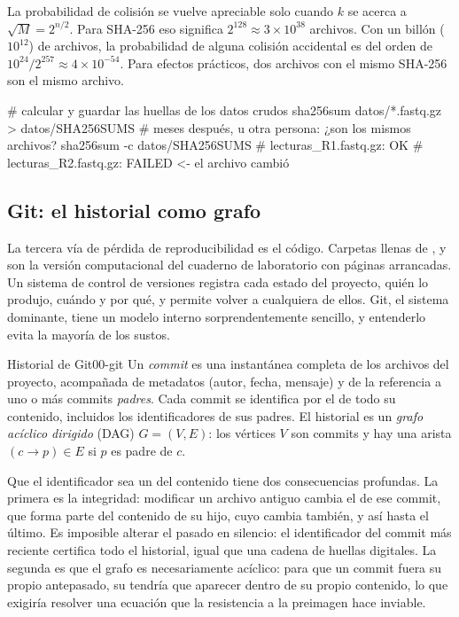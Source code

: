 La probabilidad de colisión se vuelve apreciable solo cuando $k$ se acerca a $\sqrt{M}=2^{n/2}$. Para SHA-256 eso significa $2^{128}\approx3\times10^{38}$ archivos. Con un billón ($10^{12}$) de archivos, la probabilidad de alguna colisión accidental es del orden de $10^{24}/2^{257}\approx4\times10^{-54}$. Para efectos prácticos, dos archivos con el mismo SHA-256 son el mismo archivo.

\begin{consola}
# calcular y guardar las huellas de los datos crudos
sha256sum datos/*.fastq.gz > datos/SHA256SUMS
# meses después, u otra persona: ¿son los mismos archivos?
sha256sum -c datos/SHA256SUMS
# lecturas_R1.fastq.gz: OK
# lecturas_R2.fastq.gz: FAILED     <- el archivo cambió
\end{consola}


\subsection{Git: el historial como grafo}

La tercera vía de pérdida de reproducibilidad es el código. Carpetas llenas de ,  y  son la versión computacional del cuaderno de laboratorio con páginas arrancadas. Un sistema de control de versiones registra cada estado del proyecto, quién lo produjo, cuándo y por qué, y permite volver a cualquiera de ellos. Git, el sistema dominante, tiene un modelo interno sorprendentemente sencillo, y entenderlo evita la mayoría de los sustos.

\begin{definicion}{Historial de Git}{00-git}
Un \emph{commit} es una instantánea completa de los archivos del proyecto, acompañada de metadatos (autor, fecha, mensaje) y de la referencia a uno o más commits \emph{padres}. Cada commit se identifica por el  de todo su contenido, incluidos los identificadores de sus padres. El historial es un \emph{grafo acíclico dirigido} (DAG) $G=(V,E)$: los vértices $V$ son commits y hay una arista $(c\to p)\in E$ si $p$ es padre de $c$.
\end{definicion}

Que el identificador sea un  del contenido tiene dos consecuencias profundas. La primera es la integridad: modificar un archivo antiguo cambia el  de ese commit, que forma parte del contenido de su hijo, cuyo  cambia también, y así hasta el último. Es imposible alterar el pasado en silencio: el identificador del commit más reciente certifica todo el historial, igual que una cadena de huellas digitales. La segunda es que el grafo es necesariamente acíclico: para que un commit fuera su propio antepasado, su  tendría que aparecer dentro de su propio contenido, lo que exigiría resolver una ecuación que la resistencia a la preimagen hace inviable.

